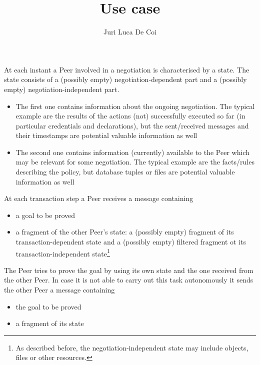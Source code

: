 \documentclass{article}
\begin{document}
\title{Use case}
\author{Juri Luca De Coi}
\maketitle

At each instant a Peer involved in a negotiation is characterised by a state. The state consists of a (possibly empty) negotiation-dependent part and a (possibly empty) negotiation-independent part.

\begin{itemize}
	\item The first one contains information about the ongoing negotiation. The typical example are the results of the actions (not) successfully executed so far (in particular credentials and declarations), but the sent/received messages and their timestamps are potential valuable information as well
	\item The second one contains information (currently) available to the Peer which may be relevant for some negotiation. The typical example are the facts/rules describing the policy, but database tuples or files are potential valuable information as well
\end{itemize}

At each transaction step a Peer receives a message containing

\begin{itemize}
	\item a goal to be proved
	\item a fragment of the other Peer's state: a (possibly empty) fragment of its transaction-dependent state and a (possibly empty) filtered fragment ot its transaction-independent state\footnote{As described before, the negotiation-independent state may include objects, files or other resources.}
\end{itemize}

The Peer tries to prove the goal by using its own state and the one received from the other Peer. In case it is not able to carry out this task autonomously it sends the other Peer a message containing

\begin{itemize}
	\item the goal to be proved
	\item a fragment of its state
\end{itemize}
\end{document}
